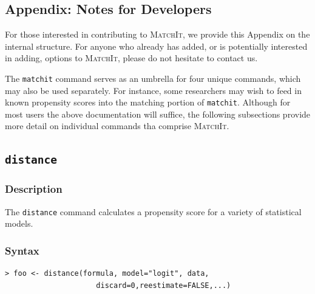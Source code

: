 \documentclass[oneside,letterpaper,titlepage]{article}
\newcommand{\MatchIt}{\textsc{MatchIt}}
\begin{document}
\begin{appendix}
\section{Appendix: Notes for Developers}
\label{reference}  
For those interested in contributing to \MatchIt, we provide this
Appendix on the internal structure.  For anyone who already has added,
or is potentially interested in adding, options to \MatchIt, please do not
hesitate to contact us.  

The \texttt{matchit} command serves as an umbrella for four
unique commands, which may also be used separately.  For instance,
some researchers may wish to feed in known propensity scores into the
matching portion of \texttt{matchit}.  Although for most users the
above documentation will suffice, the following subsections provide
more detail on individual commands tha comprise \MatchIt.

\subsection{\texttt{distance}}

\subsubsection{Description}
The \texttt{distance} command calculates a propensity score for a
variety of statistical models. 

\subsubsection{Syntax}
\begin{verbatim}
> foo <- distance(formula, model="logit", data,
                     discard=0,reestimate=FALSE,...)
\end{verbatim}


\end{appendix}
\end{document}
